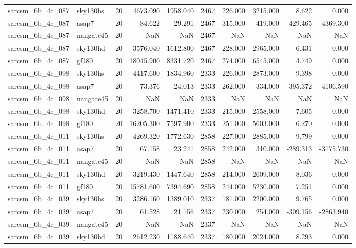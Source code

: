 \documentclass{article}
\begin{document}
\begin{longtable}{llrrrrrrrr}
sarcsm\_6b\_4c\_087 & sky130hs & 20 & 4673.090 & 1958.040 & 2467 & 226.000 & 3215.000 & 8.622 & 0.000 \\
sarcsm\_6b\_4c\_087 & asap7 & 20 & 84.622 & 29.291 & 2467 & 315.000 & 419.000 & -429.465 & -4369.300 \\
sarcsm\_6b\_4c\_087 & nangate45 & 20 & NaN & NaN & 2467 & NaN & NaN & NaN & NaN \\
sarcsm\_6b\_4c\_087 & sky130hd & 20 & 3576.040 & 1612.800 & 2467 & 228.000 & 2965.000 & 6.431 & 0.000 \\
sarcsm\_6b\_4c\_087 & gf180 & 20 & 18045.900 & 8331.720 & 2467 & 274.000 & 6545.000 & 4.749 & 0.000 \\
sarcsm\_6b\_4c\_098 & sky130hs & 20 & 4417.600 & 1834.960 & 2333 & 226.000 & 2873.000 & 9.398 & 0.000 \\
sarcsm\_6b\_4c\_098 & asap7 & 20 & 73.376 & 24.013 & 2333 & 262.000 & 334.000 & -395.372 & -4106.590 \\
sarcsm\_6b\_4c\_098 & nangate45 & 20 & NaN & NaN & 2333 & NaN & NaN & NaN & NaN \\
sarcsm\_6b\_4c\_098 & sky130hd & 20 & 3258.700 & 1471.410 & 2333 & 215.000 & 2558.000 & 7.605 & 0.000 \\
sarcsm\_6b\_4c\_098 & gf180 & 20 & 16205.300 & 7597.900 & 2333 & 251.000 & 5603.000 & 6.270 & 0.000 \\
sarcsm\_6b\_4c\_011 & sky130hs & 20 & 4269.320 & 1772.630 & 2858 & 227.000 & 2885.000 & 9.799 & 0.000 \\
sarcsm\_6b\_4c\_011 & asap7 & 20 & 67.158 & 23.241 & 2858 & 242.000 & 310.000 & -289.313 & -3175.730 \\
sarcsm\_6b\_4c\_011 & nangate45 & 20 & NaN & NaN & 2858 & NaN & NaN & NaN & NaN \\
sarcsm\_6b\_4c\_011 & sky130hd & 20 & 3219.430 & 1447.640 & 2858 & 214.000 & 2609.000 & 8.036 & 0.000 \\
sarcsm\_6b\_4c\_011 & gf180 & 20 & 15781.600 & 7394.690 & 2858 & 244.000 & 5230.000 & 7.251 & 0.000 \\
sarcsm\_6b\_4c\_039 & sky130hs & 20 & 3286.160 & 1389.010 & 2337 & 181.000 & 2200.000 & 9.765 & 0.000 \\
sarcsm\_6b\_4c\_039 & asap7 & 20 & 61.528 & 21.156 & 2337 & 230.000 & 254.000 & -309.156 & -2863.940 \\
sarcsm\_6b\_4c\_039 & nangate45 & 20 & NaN & NaN & 2337 & NaN & NaN & NaN & NaN \\
sarcsm\_6b\_4c\_039 & sky130hd & 20 & 2612.230 & 1188.640 & 2337 & 180.000 & 2024.000 & 8.293 & 0.000 \\

\end{longtable}
\end{document}
